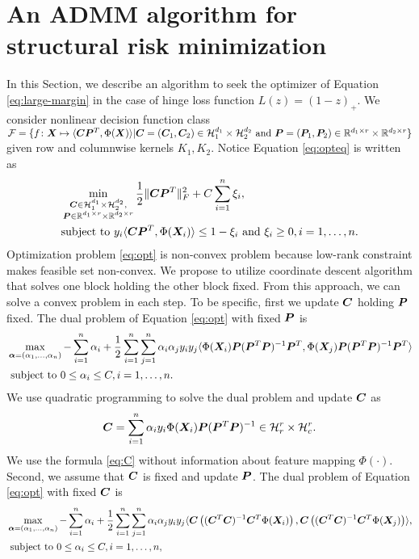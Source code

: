 \documentclass[mathptm]{statsoc}
\begin{document}
\section{An ADMM algorithm for structural risk minimization}
\label{sec:alg}
In this Section, we describe an algorithm to seek the optimizer of Equation  \eqref{eq:large-margin} in the case of hinge loss function $L(z) = (1-z)_+$. We consider nonlinear decision function class $\mathcal{F} = \{f\colon\bm X\mapsto\langle\bm C \bm{P}^T,\Phi(\bm X)\rangle|\bm C = (\bm C_1,\bm C_2)\in\mathcal{H}_1^{d_1}\times \mathcal{H}_2^{d_2} \text{ and }\bm{P} = (\bm{P}_1,\bm{P}_2)\in\mathbb{R}^{d_1\times r} \times \mathbb{R}^{d_2\times r}\}$ given row and columnwise kernels $K_1,K_2$.
Notice Equation \eqref{eq:opteq} is written as 
\begin{align}
    \label{eq:opt}
    &\min_{\substack{\bm C\in\mathcal{H}_1^{d_1}\times \mathcal{H}_2^{d_2} ,\\\bm{P}\in\mathbb{R}^{d_1\times r} \times \mathbb{R}^{d_2\times r}}}\frac{1}{2}\lVert\bm C\bm{P}^T\rVert_F^2+ C\sum_{i=1}^n \xi_i,\\
    &\text{subject to } y_i\langle\bm C\bm{P}^T,\Phi(\bm X_i)\rangle\leq 1-\xi_i\text{ and } \xi_i\geq 0, i=1,\ldots,n.
\end{align}
Optimization problem \eqref{eq:opt} is non-convex problem because low-rank constraint makes feasible set non-convex.
We propose to utilize coordinate descent algorithm that solves one block holding the other block fixed. From this approach, we can solve a convex problem in each step.
To be specific, first we update $\bm C$ holding $\bm{P}$ fixed.
The dual problem of Equation \eqref{eq:opt} with fixed $\bm{P}$ is 
\begin{align}
    \label{eq:dual1}
    &\max_{\bm\alpha = (\alpha_1,\ldots,\alpha_n)}-\sum_{i=1}^n\alpha_i + \frac{1}{2}\sum_{i=1}^n\sum_{j=1}^n \alpha_i\alpha_j y_iy_j \langle \Phi(\bm X_i)\bm{P}(\bm{P}^T\bm{P})^{-1}\bm{P}^T,\Phi(\bm X_j)\bm{P}(\bm{P}^T\bm{P})^{-1}\bm{P}^T\rangle\\
    &\text{ subject to }  0\leq \alpha_i\leq C, i=1,\ldots,n.
\end{align}
We use quadratic programming to solve the dual problem and update $\bm C$ as
\begin{align}\label{eq:C}
    \bm C = \sum_{i=1}^n \alpha_iy_i \Phi(\bm X_i) \bm{P}(\bm{P}^T\bm{P})^{-1}\in\mathcal{H}_r^r\times \mathcal{H}_c^r.
\end{align}
We use the formula \eqref{eq:C} without information about feature mapping $\Phi(\cdot)$.
Second, we assume that $\bm C$ is fixed and update $\bm{P}$. The dual problem of Equation \eqref{eq:opt} with fixed $\bm C$ is 
\begin{align}
    \label{eq:dual2}
    &\max_{\bm\alpha = (\alpha_1,\ldots,\alpha_n)}-\sum_{i=1}^n\alpha_i + \frac{1}{2}\sum_{i=1}^n\sum_{j=1}^n \alpha_i\alpha_j y_iy_j\langle 
    \bm C\left((\bm C^T\bm C)^{-1}\bm C^T\Phi(\bm X_i)\right),\bm C\left((\bm C^T\bm C)^{-1}\bm C^T\Phi(\bm X_j)\right)\rangle,\\
    &\text{ subject to }  0\leq \alpha_i\leq C, i=1,\ldots,n,
\end{align}
\end{document}
